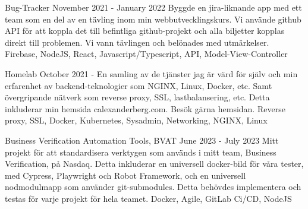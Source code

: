 \documentclass[../main.tex]{subfiles}
\begin{document}
\project
    {Bug-Tracker}
    {November 2021 - January 2022}
    {Byggde en jira-liknande app med ett team som en del av en tävling inom min webbutvecklingskurs. Vi använde github API för att koppla det till befintliga github-projekt och alla biljetter kopplas direkt till problemen. Vi vann tävlingen och belönades med utmärkelser.}
    {Firebase, NodeJS, React, Javascript/Typescript, API, Model-View-Controller}

\project
    {Homelab}
    {October 2021 -}
    {En samling av de tjänster jag är värd för själv och min erfarenhet av backend-teknologier som NGINX, Linux, Docker, etc. Samt övergripande nätverk som reverse proxy, SSL, lastbalansering, etc. Detta inkluderar min hemsida calexanderberg.com. Besök gärna hemsidan.}
    {Reverse proxy, SSL, Docker, Kubernetes, Sysadmin, Networking, NGINX, Linux}


\project
    {Business Verification Automation Tools, BVAT}
    {June 2023 - July 2023}
    {Mitt projekt för att standardisera verktygen som används i mitt team, Business Verification, på Nasdaq. Detta inkluderar en universell docker-bild för våra tester, med Cypress, Playwright och Robot Framework, och en universell nodmodulmapp som använder git-submodules. Detta behövdes implementera och testas för varje projekt för hela teamet.}
    {Docker, Agile, GitLab Ci/CD, NodeJS}
    
\end{document}
